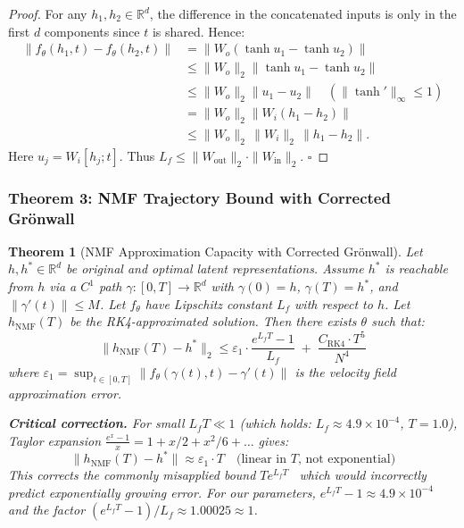 \documentclass{scpe}
\newtheorem{theorem}{Theorem}[section]
\newcommand{\RR}{\mathbb{R}}
\begin{document}
\begin{proof}
For any $h_1, h_2 \in \RR^d$, the difference in the concatenated inputs is only in the first $d$ components since $t$ is shared. Hence:
{\footnotesize
\begin{align}
\|f_\theta(h_1,t) - f_\theta(h_2,t)\|
&= \|W_o(\tanh u_1 - \tanh u_2)\| \label{eq:lip-a}\\
&\leq \|W_o\|_2 \|\tanh u_1 - \tanh u_2\| \label{eq:lip-b}\\
&\leq \|W_o\|_2 \|u_1 - u_2\| \quad (\|\tanh'\|_\infty \leq 1) \label{eq:lip-c}\\
&= \|W_o\|_2 \|W_i(h_1-h_2)\| \label{eq:lip-d}\\
&\leq \|W_o\|_2\,\|W_i\|_2\,\|h_1-h_2\|. \label{eq:lip-e}
\end{align}
}
Here $u_j = W_i[h_j;t]$.
Thus $L_f \leq \|W_{\text{out}}\|_2 \cdot \|W_{\text{in}}\|_2$. $\square$
\end{proof}

\subsubsection{Theorem 3: NMF Trajectory Bound with Corrected Gr\"onwall}

\begin{theorem}[NMF Approximation Capacity with Corrected Gr\"onwall]
\label{thm:nmf-traj}
Let $h, h^* \in \RR^d$ be original and optimal latent representations. Assume $h^*$ is reachable from $h$ via a $C^1$ path $\gamma: [0,T] \to \RR^d$ with $\gamma(0) = h$, $\gamma(T) = h^*$, and $\|\gamma'(t)\| \leq M$. Let $f_\theta$ have Lipschitz constant $L_f$ with respect to $h$. Let $h_{\text{NMF}}(T)$ be the RK4-approximated solution. Then there exists $\theta$ such that:
\begin{equation}
\|h_{\text{NMF}}(T) - h^*\|_2 \leq \varepsilon_1 \cdot \frac{e^{L_f T} - 1}{L_f} \;+\; \frac{C_{\text{RK4}} \cdot T^5}{N^4}
\end{equation}
where $\varepsilon_1 = \sup_{t \in [0,T]} \|f_\theta(\gamma(t),t) - \gamma'(t)\|$ is the velocity field approximation error.

\textbf{Critical correction.} For small $L_f T \ll 1$ (which holds: $L_f \approx 4.9\times 10^{-4}$, $T=1.0$), Taylor expansion $\frac{e^x-1}{x} = 1 + x/2 + x^2/6 + \dots$ gives:
\begin{equation}
\|h_{\text{NMF}}(T) - h^*\| \approx \varepsilon_1 \cdot T \quad\text{(linear in $T$, not exponential)}
\end{equation}
This corrects the commonly misapplied bound $T e^{L_f T}$~\cite{chen2018neuralode} which would incorrectly predict exponentially growing error. For our parameters, $e^{L_f T} - 1 \approx 4.9\times 10^{-4}$ and the factor $(e^{L_f T}-1)/L_f \approx 1.00025 \approx 1$.
\end{theorem}
\end{document}
